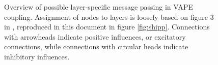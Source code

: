 \begin{figure}
  \centering

  \small

  \newcommand{\w}[1]{\textcolor{white}{#1}}
  \def\svgwidth{0.9\textwidth}


  \caption{Overview of possible layer-specific message passing in \textsf{VAPE} coupling. Assignment of nodes to layers is loosely based on figure 3 in \cite{Shipp2016}, reproduced in this document in figure \ref{fig:shipp}. Connections with arrowheads indicate positive influences, or excitatory connections, while connections with circular heads indicate inhibitory influences.}
  \label{\figlabel}
\end{figure}